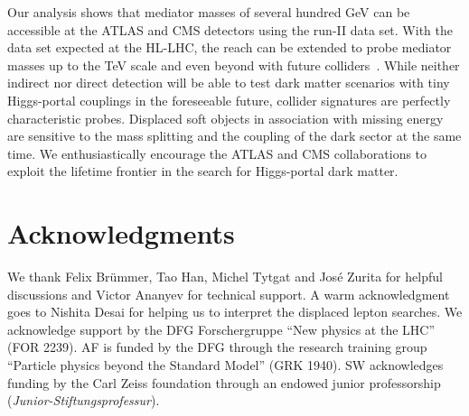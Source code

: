 \documentclass[nofootinbib,prd,aps,superscriptaddress,preprintnumbers]{revtex4}
\renewcommand{\emph}{\textit}
\begin{document}
Our analysis shows that mediator masses of several hundred GeV can be accessible at the ATLAS and CMS detectors using the run-II data set. With the data set expected at the HL-LHC, the reach can be extended to probe mediator masses up to the TeV scale and even beyond with future colliders~\cite{Bramante:2015una,Low:2014cba,Mahbubani:2017gjh,Han:2018wus,Kadota:2018lrt}. While neither indirect nor direct detection will be able to test dark matter scenarios with tiny Higgs-portal couplings in the foreseeable future, collider signatures are perfectly characteristic probes. Displaced soft objects in association with missing energy are sensitive to the mass splitting and the coupling of the dark sector at the same time. We enthusiastically encourage the ATLAS and CMS collaborations to exploit the lifetime frontier in the search for Higgs-portal dark matter.


\section{Acknowledgments}
\noindent We thank Felix Br\"ummer, Tao Han, Michel Tytgat and Jos\'e Zurita for helpful discussions and Victor Ananyev for technical support. A warm acknowledgment goes to Nishita Desai for helping us to interpret the displaced lepton searches. We acknowledge support by the DFG Forschergruppe ``New physics at the LHC'' (FOR 2239). AF is funded by the DFG through the research training group ``Particle physics beyond the Standard
Model'' (GRK 1940). SW acknowledges funding by the Carl Zeiss foundation through an endowed junior professorship (\emph{Junior-Stiftungsprofessur}).


\let\oldaddcontentsline\addcontentsline
\renewcommand{\addcontentsline}[3]{}
\end{document}
